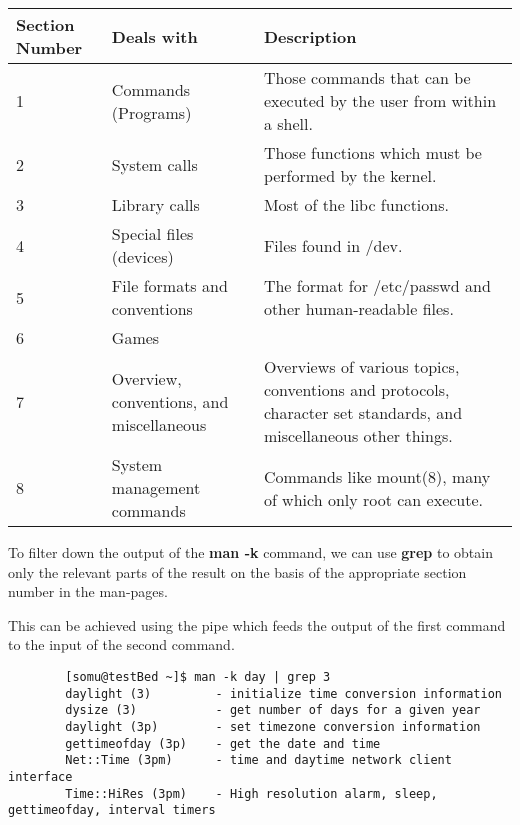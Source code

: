 \documentclass{report}
\begin{document}
	\vspace{-5pt}
	\noindent
	\begin{tabular}{p{}p{}p{}}
		\toprule
		Section Number & Deals with & Description \\
		\midrule
		1 & Commands (Programs) & Those  commands  that  can  be executed  by the user from within a	shell. \\
		2 & System calls & Those functions which must be performed by the kernel. \\		
		3 & Library calls & Most of the libc functions. \\		
		4 & Special files (devices) & Files found in /dev. \\		
		5 & File formats and conventions & The format for /etc/passwd and other human-readable files. \\		
		6 & Games & \\		
		7 & Overview, conventions, and miscellaneous & Overviews of various topics, conventions and  protocols,  character set standards, and miscellaneous other things. \\		
		8 & System management commands & Commands like mount(8), many of which only root can execute.	\\
		\bottomrule
	\end{tabular}
	
	\noindent
	To filter down the output of the \textbf{man -k} command, we can use \textbf{grep} to obtain only the relevant parts of the result on the basis of the appropriate section number in the man-pages. 
	
	\noindent
	This can be achieved using the pipe which feeds the output of the first command to the input of the second command. 
	
	\vspace{-20pt}
	\begin{verbatim}
		[somu@testBed ~]$ man -k day | grep 3
		daylight (3)         - initialize time conversion information
		dysize (3)           - get number of days for a given year
		daylight (3p)        - set timezone conversion information
		gettimeofday (3p)    - get the date and time
		Net::Time (3pm)      - time and daytime network client interface
		Time::HiRes (3pm)    - High resolution alarm, sleep, gettimeofday, interval timers
	\end{verbatim}
	
	\vspace{-20pt}
	\noindent
	
\end{document}
